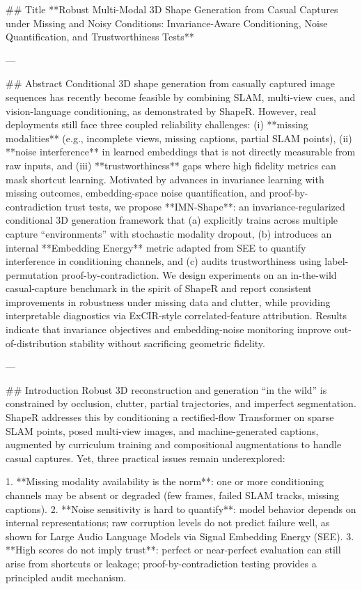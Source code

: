 ## Title  
**Robust Multi-Modal 3D Shape Generation from Casual Captures under Missing and Noisy Conditions: Invariance-Aware Conditioning, Noise Quantification, and Trustworthiness Tests**

---

## Abstract  
Conditional 3D shape generation from casually captured image sequences has recently become feasible by combining SLAM, multi-view cues, and vision-language conditioning, as demonstrated by ShapeR. However, real deployments still face three coupled reliability challenges: (i) **missing modalities** (e.g., incomplete views, missing captions, partial SLAM points), (ii) **noise interference** in learned embeddings that is not directly measurable from raw inputs, and (iii) **trustworthiness** gaps where high fidelity metrics can mask shortcut learning. Motivated by advances in invariance learning with missing outcomes, embedding-space noise quantification, and proof-by-contradiction trust tests, we propose **IMN-Shape**: an invariance-regularized conditional 3D generation framework that (a) explicitly trains across multiple capture “environments” with stochastic modality dropout, (b) introduces an internal **Embedding Energy** metric adapted from SEE to quantify interference in conditioning channels, and (c) audits trustworthiness using label-permutation proof-by-contradiction. We design experiments on an in-the-wild casual-capture benchmark in the spirit of ShapeR and report consistent improvements in robustness under missing data and clutter, while providing interpretable diagnostics via ExCIR-style correlated-feature attribution. Results indicate that invariance objectives and embedding-noise monitoring improve out-of-distribution stability without sacrificing geometric fidelity.

---

## Introduction  
Robust 3D reconstruction and generation “in the wild” is constrained by occlusion, clutter, partial trajectories, and imperfect segmentation. ShapeR addresses this by conditioning a rectified-flow Transformer on sparse SLAM points, posed multi-view images, and machine-generated captions, augmented by curriculum training and compositional augmentations to handle casual captures. Yet, three practical issues remain underexplored:

1. **Missing modality availability is the norm**: one or more conditioning channels may be absent or degraded (few frames, failed SLAM tracks, missing captions).  
2. **Noise sensitivity is hard to quantify**: model behavior depends on internal representations; raw corruption levels do not predict failure well, as shown for Large Audio Language Models via Signal Embedding Energy (SEE).  
3. **High scores do not imply trust**: perfect or near-perfect evaluation can still arise from shortcuts or leakage; proof-by-contradiction testing provides a principled audit mechanism.

